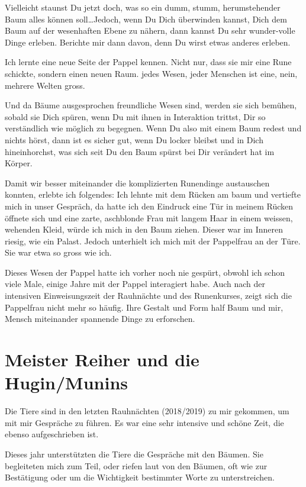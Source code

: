 \documentclass[11pt,titlepage,a5paper]{book}
\begin{document}
Vielleicht staunst Du jetzt doch, was so ein dumm, stumm, herumstehender Baum alles können soll\dots Jedoch, wenn Du Dich überwinden kannst, Dich dem Baum auf der wesenhaften Ebene zu nähern, dann kannst Du sehr wunder-volle Dinge erleben. Berichte mir dann davon, denn Du wirst etwas anderes erleben.

Ich lernte eine neue Seite der Pappel kennen. Nicht nur, dass sie mir eine Rune schickte, sondern einen neuen Raum. jedes Wesen, jeder Menschen ist eine, nein, mehrere Welten gross.

Und da Bäume ausgesprochen freundliche Wesen sind, werden sie sich bemühen, sobald sie Dich spüren, wenn Du mit ihnen in Interaktion trittst, Dir so verständlich wie möglich zu begegnen. Wenn Du also mit einem Baum redest und nichts hörst, dann ist es sicher gut, wenn Du locker bleibst und in Dich hineinhorchst, was sich seit Du den Baum spürst bei  Dir verändert hat im Körper.

Damit wir besser miteinander die komplizierten Runendinge austauschen konnten, erlebte ich folgendes: Ich lehnte mit dem Rücken am baum und vertiefte mich in unser Gespräch, da hatte ich den Eindruck eine Tür in meinem Rücken öffnete sich und eine zarte, aschblonde Frau mit langem Haar in einem weissen, wehenden Kleid, würde ich mich in den Baum ziehen. Dieser war im Inneren riesig, wie ein Palast. Jedoch unterhielt ich mich mit der Pappelfrau an der Türe. Sie war etwa so gross wie ich.

Dieses Wesen der Pappel hatte ich vorher noch nie gespürt, obwohl ich schon viele Male, einige Jahre mit der Pappel interagiert habe. Auch nach der intensiven Einweisungszeit der Rauhnächte und des Runenkurses, zeigt sich die Pappelfrau nicht mehr so häufig. Ihre Gestalt und Form half Baum und mir, Mensch miteinander spannende Dinge zu erforschen.


\section{Meister Reiher und die Hugin/Munins }

Die Tiere sind in den letzten Rauhnächten (2018/2019) zu mir gekommen, um mit mir Gespräche zu führen. Es war eine sehr intensive und schöne Zeit, die ebenso aufgeschrieben ist.

Dieses jahr unterstützten die Tiere die Gespräche mit den Bäumen. Sie begleiteten mich zum Teil, oder riefen laut von den Bäumen, oft wie zur Bestätigung oder um die Wichtigkeit bestimmter Worte zu unterstreichen.
\end{document}
